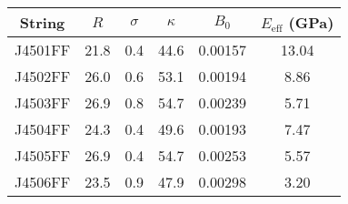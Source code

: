 \begin{tabular}{cccccc}
\toprule
String & $R$ & $\sigma$ & $\kappa$ & $B_0$ & $E_\mathrm{eff}$ (GPa) \\
\midrule
J4501FF & 21.8 & 0.4 & 44.6 & 0.00157 & 13.04 \\
J4502FF & 26.0 & 0.6 & 53.1 & 0.00194 & 8.86 \\
J4503FF & 26.9 & 0.8 & 54.7 & 0.00239 & 5.71 \\
J4504FF & 24.3 & 0.4 & 49.6 & 0.00193 & 7.47 \\
J4505FF & 26.9 & 0.4 & 54.7 & 0.00253 & 5.57 \\
J4506FF & 23.5 & 0.9 & 47.9 & 0.00298 & 3.20 \\
\bottomrule
\end{tabular}
